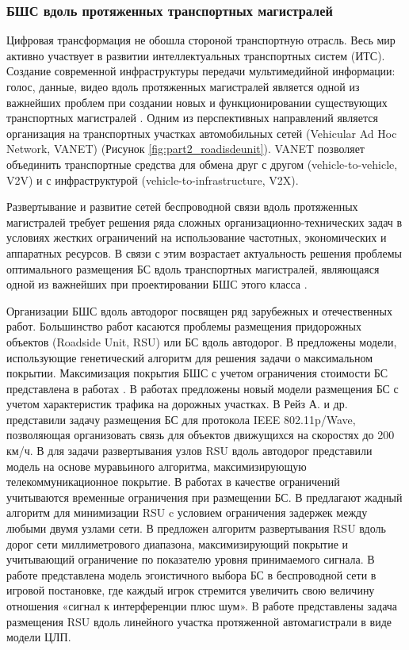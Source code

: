 \subsubsection{БШС вдоль протяженных транспортных магистралей}

Цифровая трансформация не обошла стороной транспортную отрасль. Весь мир активно участвует в развитии интеллектуальных транспортных систем (ИТС).  Создание современной инфраструктуры передачи мультимедийной информации: голос, данные, видео вдоль протяженных магистралей является одной из важнейших проблем при создании новых и функционировании существующих транспортных магистралей \cite{Vish2015}. Одним из перспективных направлений  является организация на транспортных участках автомобильных сетей (Vehicular Ad Hoc Network, VANET) \cite{Massobrio2020, Campolo2015, EAKoucheryavy} (Рисунок \cref{fig:part2_roadisdeunit}). VANET позволяет объединить транспортные средства для обмена друг с другом (vehicle-to-vehicle, V2V) и с инфраструктурой (vehicle-to-infrastructure, V2X). 

Развертывание и развитие сетей беспроводной связи вдоль протяженных магистралей требует решения ряда сложных организационно-технических задач в условиях жестких ограничений на использование частотных, экономических и аппаратных ресурсов. В связи с этим возрастает актуальность решения проблемы оптимального размещения БС вдоль транспортных магистралей, являющаяся одной из важнейших при проектировании БШС этого класса \cite{Vish2015}. 

Организации БШС вдоль автодорог посвящен ряд зарубежных и отечественных работ. Большинство работ касаются проблемы размещения придорожных объектов (Roadside Unit, RSU) или БС вдоль автодорог. В \cite{Cavalcante2012, KHireddine2020} предложены модели, использующие генетический алгоритм для решения задачи о максимальном покрытии. Максимизация покрытия БШС с учетом ограничения стоимости БС представлена в работах \cite{BenBrahim2014, Vishnevsky2016_optimization}. В работах \cite{Liu2014, Gao2018, Jalooli2019} предложены новый модели размещения БС с учетом характеристик трафика на дорожных участках. В \cite{Reis2014} Рейз А. и др. представили задачу размещения БС для протокола IEEE 802.11p/Wave, позволяющая организовать связь для объектов движущихся на скоростях до 200 км/ч.   В \cite{Guerna2021} для задачи развертывания узлов RSU вдоль автодорог представили модель на основе муравьиного алгоритма, максимизирующую телекоммуникационное покрытие. В работах \cite{Cavalcante2012, Liu2017} в качестве ограничений учитываются временные ограничения при размещении БС. В \cite{Bao2018} предлагают жадный алгоритм для минимизации RSU c условием ограничения задержек между любыми двумя узлами сети. В \cite{Mavromatis2019} предложен алгоритм развертывания RSU вдоль дорог сети миллиметрового диапазона, максимизирующий покрытие и учитывающий ограничение по показателю уровня принимаемого сигнала. В работе \cite{Chirkova2020} представлена модель эгоистичного выбора БС  в беспроводной сети в игровой постановке, где каждый игрок стремится увеличить свою величину отношения «сигнал к интерференции плюс шум». В работе \cite{Ivanov2018} представлены задача размещения RSU вдоль линейного участка протяженной автомагистрали в виде модели ЦЛП.




